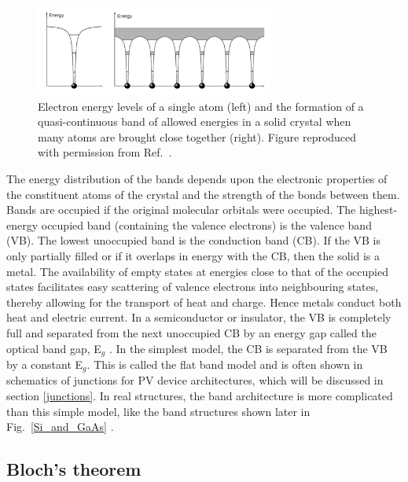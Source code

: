 \documentclass[11pt, twoside]{report}
\begin{document}
\begin{figure}[h!]
  \centering
    \includegraphics[width=0.7\textwidth]{figures/band_Elevels.png}
    \caption[Electron energy levels of a single atom (left) and the formation of a quasi-continuous band of allowed energies in a solid crystal when many atoms are brought close together (right).]{Electron energy levels of a single atom (left) and the formation of a quasi-continuous band of allowed energies in a solid crystal when many atoms are brought close together (right). Figure reproduced with permission from Ref.~.}
  \label{band_Elevels}
\end{figure}

The energy distribution of the bands depends upon the electronic properties of the constituent atoms of the crystal and the strength of the bonds between them. Bands are occupied if the original molecular orbitals were occupied. The highest-energy occupied band (containing the valence electrons) is the valence band (VB). The lowest unoccupied band is the conduction band (CB). If the VB is only partially filled or if it overlaps in energy with the CB, then the solid is a metal. The availability of empty states at energies close to that of the occupied states facilitates easy scattering of valence electrons into neighbouring states, thereby allowing for the transport of heat and charge. Hence metals conduct both heat and electric current. In a semiconductor or insulator, the VB is completely full and separated from the next unoccupied CB by an energy gap called the optical band gap, E$_g$ \cite{Nelson3}. In the simplest model, the CB is separated from the VB by a constant E$_g$. This is called the flat band model and is often shown in schematics of junctions for PV device architectures, which will be discussed in section \ref{junctions}. In real structures, the band architecture is more complicated than this simple model, like the band structures shown later in Fig.~\ref{Si_and_GaAs} \cite{Tilley}.


\subsection{Bloch's theorem}
\end{document}
